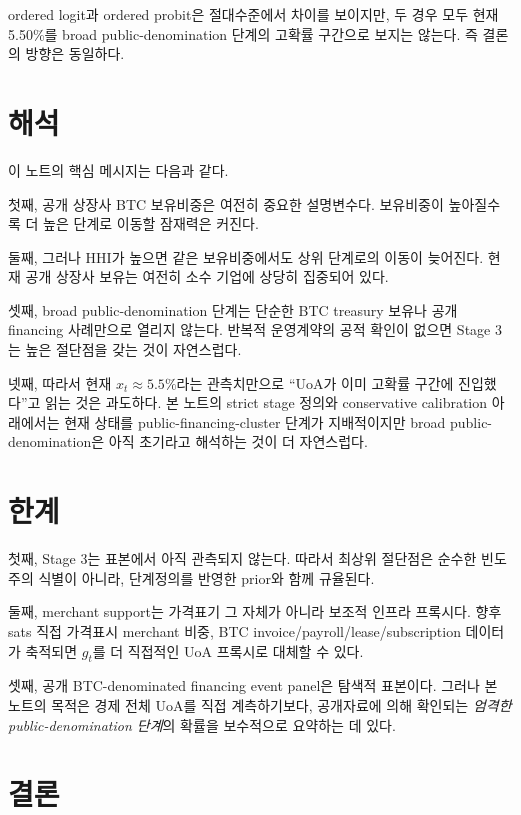 \documentclass[11pt,a4paper]{article}
\begin{document}
ordered logit과 ordered probit은 절대수준에서 차이를 보이지만, 두 경우 모두 현재 5.50\%를 broad public-denomination 단계의 고확률 구간으로 보지는 않는다. 즉 결론의 방향은 동일하다.

\section{해석}

이 노트의 핵심 메시지는 다음과 같다.

첫째, 공개 상장사 BTC 보유비중은 여전히 중요한 설명변수다. 보유비중이 높아질수록 더 높은 단계로 이동할 잠재력은 커진다.

둘째, 그러나 HHI가 높으면 같은 보유비중에서도 상위 단계로의 이동이 늦어진다. 현재 공개 상장사 보유는 여전히 소수 기업에 상당히 집중되어 있다.

셋째, broad public-denomination 단계는 단순한 BTC treasury 보유나 공개 financing 사례만으로 열리지 않는다. 반복적 운영계약의 공적 확인이 없으면 Stage 3는 높은 절단점을 갖는 것이 자연스럽다.

넷째, 따라서 현재 $x_t\approx 5.5\%$라는 관측치만으로 ``UoA가 이미 고확률 구간에 진입했다''고 읽는 것은 과도하다. 본 노트의 strict stage 정의와 conservative calibration 아래에서는 현재 상태를 public-financing-cluster 단계가 지배적이지만 broad public-denomination은 아직 초기라고 해석하는 것이 더 자연스럽다.

\section{한계}

첫째, Stage 3는 표본에서 아직 관측되지 않는다. 따라서 최상위 절단점은 순수한 빈도주의 식별이 아니라, 단계정의를 반영한 prior와 함께 규율된다.

둘째, merchant support는 가격표기 그 자체가 아니라 보조적 인프라 프록시다. 향후 sats 직접 가격표시 merchant 비중, BTC invoice/payroll/lease/subscription 데이터가 축적되면 $g_t$를 더 직접적인 UoA 프록시로 대체할 수 있다.

셋째, 공개 BTC-denominated financing event panel은 탐색적 표본이다. 그러나 본 노트의 목적은 경제 전체 UoA를 직접 계측하기보다, 공개자료에 의해 확인되는 \emph{엄격한 public-denomination 단계}의 확률을 보수적으로 요약하는 데 있다.

\section{결론}
\end{document}
